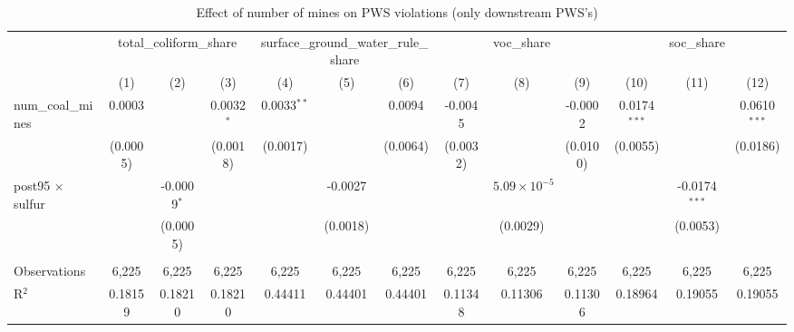 
\begin{table}[htbp]
   \caption{\label{olsrf2sls_nummine_nonmine_vio_1985to2005dwnstrm} Effect of number of mines on PWS violations (only downstream PWS's)}
   \bigskip
   \centering
   \begin{adjustbox}{width = \textwidth, center}
      \begin{tabular}{lcccccccccccc}
         \toprule
          & \multicolumn{3}{c}{total\_coliform\_share} & \multicolumn{3}{c}{surface\_ground\_water\_rule\_share} & \multicolumn{3}{c}{voc\_share} & \multicolumn{3}{c}{soc\_share}\\
                                                & (1)           & (2)           & (3)           & (4)           & (5)           & (6)           & (7)           & (8)                   & (9)                   & (10)           & (11)            & (12)\\  
         \midrule 
         num\_coal\_mines                       & 0.0003        &               & 0.0032$^{*}$  & 0.0033$^{**}$ &               & 0.0094        & -0.0045       &                       & -0.0002               & 0.0174$^{***}$ &                 & 0.0610$^{***}$\\   
                                                & (0.0005)      &               & (0.0018)      & (0.0017)      &               & (0.0064)      & (0.0032)      &                       & (0.0100)              & (0.0055)       &                 & (0.0186)\\   
         post95 $\times$ sulfur                 &               & -0.0009$^{*}$ &               &               & -0.0027       &               &               & $5.09\times 10^{-5}$  &                       &                & -0.0174$^{***}$ &   \\   
                                                &               & (0.0005)      &               &               & (0.0018)      &               &               & (0.0029)              &                       &                & (0.0053)        &   \\   
          \\
         Observations                           & 6,225         & 6,225         & 6,225         & 6,225         & 6,225         & 6,225         & 6,225         & 6,225                 & 6,225                 & 6,225          & 6,225           & 6,225\\  
         R$^2$                                  & 0.18159       & 0.18210       & 0.18210       & 0.44411       & 0.44401       & 0.44401       & 0.11348       & 0.11306               & 0.11306               & 0.18964        & 0.19055         & 0.19055\\  

\end{tabular}
\end{adjustbox}
\end{table}
